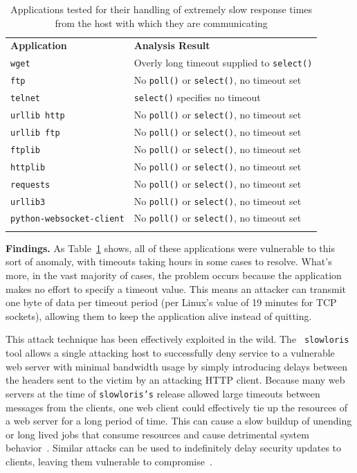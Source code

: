 \begin{table}[t]
  \scriptsize{}
  \begin{tabular}{l | l}
    \toprule{}
    {\bf Application}              & {\bf Analysis Result}\\
    {\tt wget}                     & Overly long timeout supplied to {\tt select()} \\
    {\tt ftp}                      & No {\tt poll()} or {\tt select()}, no timeout set \\
    {\tt telnet}                   & {\tt select()} specifies no timeout \\
    {\tt urllib http}              & No {\tt poll()} or {\tt select()}, no timeout set \\
    {\tt urllib ftp}               & No {\tt poll()} or {\tt select()}, no timeout set \\
    {\tt ftplib}                   & No {\tt poll()} or {\tt select()}, no timeout set \\
    {\tt httplib}                  & No {\tt poll()} or {\tt select()}, no timeout set \\
    {\tt requests}                 & No {\tt poll()} or {\tt select()}, no timeout set \\
    {\tt urllib3}                  & No {\tt poll()} or {\tt select()}, no timeout set \\
    {\tt python-websocket-client}  & No {\tt poll()} or {\tt select()}, no timeout set \\
    \bottomrule{}
  \end{tabular}
  \caption{Applications tested for their handling of extremely slow response
    times from the host with which they are communicating }
  \label{table:slowloris}
\end{table}


{\bf Findings.} As Table~\ref{table:slowloris} shows, all of these
applications were vulnerable to this sort of anomaly, with timeouts taking
hours in some cases to resolve.
What's more, in the vast majority of
cases, the problem occurs because the application makes no effort to
specify a timeout value.  This means an attacker can transmit one byte of
data per timeout period (per Linux's value of 19 minutes for TCP sockets),
allowing them to keep the application alive instead of quitting.


This attack technique has been effectively exploited in the wild.  The {\tt
slowloris} tool allows a single attacking host to successfully deny service
to a vulnerable web server with minimal bandwidth usage by simply
introducing delays between the headers sent to the victim by an attacking
HTTP client.  Because many web servers at the time  of {\tt slowloris's} release
allowed large timeouts
between messages from the clients, one web client could effectively tie up
the resources of a web server for a long period of time.
This can cause a slow buildup of unending or long lived jobs that consume
resources and cause detrimental system behavior~\cite{Slowloris}.
Similar attacks can be used to indefinitely delay security updates to
clients, leaving them vulnerable to compromise~\cite{Cappos_TR_08}.

